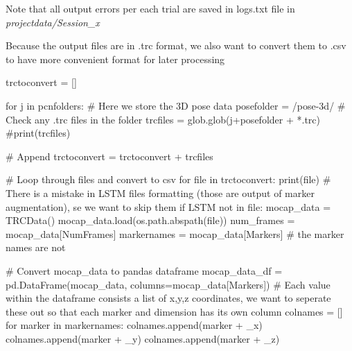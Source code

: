 \documentclass[
  letterpaper,
  DIV=11,
  numbers=noendperiod]{scrreprt}
\newenvironment{Shaded}{\begin{snugshade}}{\end{snugshade}}
\newcommand{\BuiltInTok}[1]{\textcolor[rgb]{0.00,0.23,0.31}{#1}}
\newcommand{\CommentTok}[1]{\textcolor[rgb]{0.37,0.37,0.37}{#1}}
\newcommand{\ControlFlowTok}[1]{\textcolor[rgb]{0.00,0.23,0.31}{#1}}
\newcommand{\KeywordTok}[1]{\textcolor[rgb]{0.00,0.23,0.31}{#1}}
\newcommand{\NormalTok}[1]{\textcolor[rgb]{0.00,0.23,0.31}{#1}}
\newcommand{\OperatorTok}[1]{\textcolor[rgb]{0.37,0.37,0.37}{#1}}
\newcommand{\StringTok}[1]{\textcolor[rgb]{0.13,0.47,0.30}{#1}}
\begin{document}
Note that all output errors per each trial are saved in logs.txt file in
\emph{projectdata/Session\_x}

Because the output files are in .trc format, we also want to convert
them to .csv to have more convenient format for later processing

\begin{Shaded}
\begin{Highlighting}[]
\NormalTok{trctoconvert }\OperatorTok{=}\NormalTok{ []}

\ControlFlowTok{for}\NormalTok{ j }\KeywordTok{in}\NormalTok{ pcnfolders:}
    \CommentTok{\# Here we store the 3D pose data}
\NormalTok{    posefolder }\OperatorTok{=} \StringTok{\textquotesingle{}/pose{-}3d/\textquotesingle{}}
    \CommentTok{\# Check any .trc files in the folder}
\NormalTok{    trcfiles }\OperatorTok{=}\NormalTok{ glob.glob(j}\OperatorTok{+}\NormalTok{posefolder }\OperatorTok{+} \StringTok{\textquotesingle{}*.trc\textquotesingle{}}\NormalTok{)}
    \CommentTok{\#print(trcfiles)}
    
    \CommentTok{\# Append}
\NormalTok{    trctoconvert }\OperatorTok{=}\NormalTok{ trctoconvert }\OperatorTok{+}\NormalTok{ trcfiles}

\CommentTok{\# Loop through files and convert to csv}
\ControlFlowTok{for} \BuiltInTok{file} \KeywordTok{in}\NormalTok{ trctoconvert:}
    \BuiltInTok{print}\NormalTok{(}\BuiltInTok{file}\NormalTok{)}
    \CommentTok{\# There is a mistake in LSTM files formatting (those are output of marker augmentation), se we want to skip them}
    \ControlFlowTok{if} \StringTok{\textquotesingle{}LSTM\textquotesingle{}} \KeywordTok{not} \KeywordTok{in} \BuiltInTok{file}\NormalTok{:}
\NormalTok{        mocap\_data }\OperatorTok{=}\NormalTok{ TRCData()}
\NormalTok{        mocap\_data.load(os.path.abspath(}\BuiltInTok{file}\NormalTok{))}
\NormalTok{        num\_frames }\OperatorTok{=}\NormalTok{ mocap\_data[}\StringTok{\textquotesingle{}NumFrames\textquotesingle{}}\NormalTok{]}
\NormalTok{        markernames }\OperatorTok{=}\NormalTok{ mocap\_data[}\StringTok{\textquotesingle{}Markers\textquotesingle{}}\NormalTok{] }\CommentTok{\# the marker names are not}

        \CommentTok{\# Convert mocap\_data to pandas dataframe}
\NormalTok{        mocap\_data\_df }\OperatorTok{=}\NormalTok{ pd.DataFrame(mocap\_data, columns}\OperatorTok{=}\NormalTok{mocap\_data[}\StringTok{\textquotesingle{}Markers\textquotesingle{}}\NormalTok{])}
        \CommentTok{\# Each value within the dataframe consists a list of x,y,z coordinates, we want to seperate these out so that each marker and dimension has its own column}
\NormalTok{        colnames }\OperatorTok{=}\NormalTok{ []}
        \ControlFlowTok{for}\NormalTok{ marker }\KeywordTok{in}\NormalTok{ markernames:}
\NormalTok{            colnames.append(marker }\OperatorTok{+} \StringTok{\textquotesingle{}\_x\textquotesingle{}}\NormalTok{)}
\NormalTok{            colnames.append(marker }\OperatorTok{+} \StringTok{\textquotesingle{}\_y\textquotesingle{}}\NormalTok{)}
\NormalTok{            colnames.append(marker }\OperatorTok{+} \StringTok{\textquotesingle{}\_z\textquotesingle{}}\NormalTok{)}


\end{Highlighting}
\end{Shaded}
\end{document}
